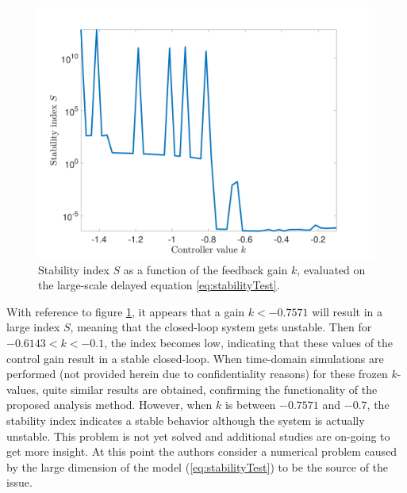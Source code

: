 \documentclass[graybox]{svmult}
\begin{document}
\begin{figure}[bth]
	\sidecaption[]
	\includegraphics[scale=.2]{stabilityAnalysis.pdf}
	\caption{Stability index $S$ as a function of the feedback gain $k$, evaluated on the large-scale delayed equation \eqref{eq:stabilityTest}. }
	\label{fig:stability}	
\end{figure}
With reference to figure \ref{fig:stability}, it appears that a gain $k<-0.7571$ will result in a large index $S$, meaning that the closed-loop system gets unstable. Then for $-0.6143<k<-0.1$, the index becomes low, indicating that these values of the control gain result in a stable closed-loop. When time-domain simulations are performed (not provided herein due to confidentiality reasons) for these frozen $k$-values, quite similar results are obtained, confirming the functionality of the proposed analysis method.
However, when $k$ is  between $-0.7571$ and $-0.7$, the stability index indicates a stable behavior although the system is actually unstable. This problem is not yet solved and additional studies are on-going to get more insight.
At this point the authors consider a numerical problem caused by the large dimension of the model (\ref{eq:stabilityTest})  to be the source of the issue. 
\end{document}
